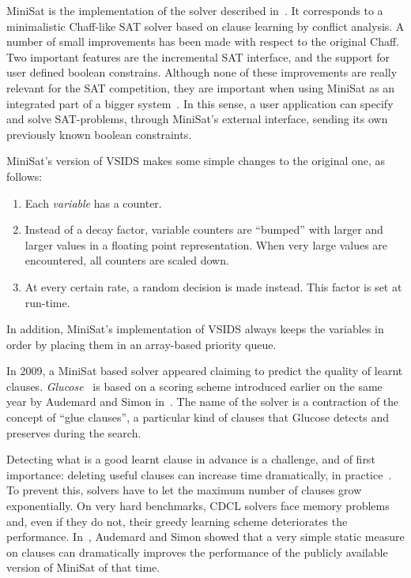 MiniSat is the implementation of the solver described
in~\cite{een2003extensible}. It corresponds to a minimalistic Chaff-like SAT
solver based on clause learning by conflict analysis. A number of small
improvements has been made with respect to the original Chaff. Two important
features are the incremental SAT interface, and the support for user defined
boolean constrains. Although none of these improvements are really relevant for
the SAT competition, they are important when using MiniSat as an integrated part
of a bigger system~\cite{minisat}. In this sense, a user application can specify
and solve SAT-problems, through MiniSat's external interface, sending its own
previously known boolean constraints.

MiniSat's version of VSIDS makes some simple changes to the original one, as
follows:

\begin{enumerate}
    \item Each \emph{variable} has a counter.
    \item Instead of a decay factor, variable counters are ``bumped'' with
        larger and larger values in a floating point representation. When very
        large values are encountered, all counters are scaled down.
    \item At every certain rate, a random decision is made instead.
        This factor is set at run-time.
\end{enumerate}
In addition, MiniSat's implementation of VSIDS always keeps the variables in
order by placing them in an array-based priority queue.

In 2009, a MiniSat based solver appeared claiming to predict the quality of
learnt clauses. \emph{Glucose}~\cite{glucose} is based on a scoring scheme
introduced earlier on the same year by Audemard and Simon
in~\cite{audemard2009predicting}. The name of the solver is a contraction of the
concept of ``glue clauses'', a particular kind of clauses that Glucose detects
and preserves during the search.

Detecting what is a good learnt clause in advance is a challenge, and of first
importance: deleting useful clauses can increase time dramatically, in
practice~\cite{glucose}. To prevent this, solvers have to let the maximum
number of clauses grow exponentially. On very hard benchmarks, CDCL solvers face
memory problems and, even if they do not, their greedy learning scheme
deteriorates the performance.  In~\cite{audemard2009predicting}, Audemard and
Simon showed that a very simple static measure on clauses can dramatically
improves the performance of the publicly available version of MiniSat of that
time.

